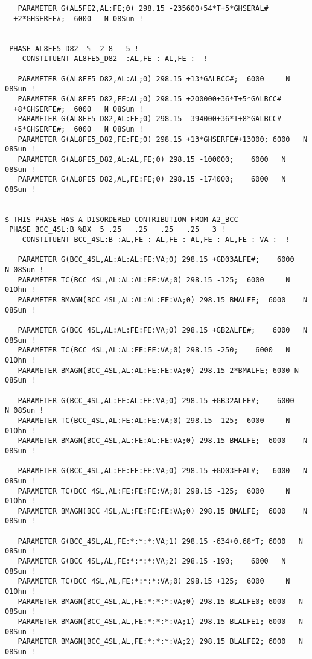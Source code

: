 \documentclass[12pt]{article}
\begin{document}
\begin{appendices}
{\begin{verbatim}
   PARAMETER G(AL5FE2,AL:FE;0) 298.15 -235600+54*T+5*GHSERAL#
  +2*GHSERFE#;  6000   N 08Sun !


 PHASE AL8FE5_D82  %  2 8   5 !
    CONSTITUENT AL8FE5_D82  :AL,FE : AL,FE :  !

   PARAMETER G(AL8FE5_D82,AL:AL;0) 298.15 +13*GALBCC#;  6000     N 08Sun !
   PARAMETER G(AL8FE5_D82,FE:AL;0) 298.15 +200000+36*T+5*GALBCC#
  +8*GHSERFE#;  6000   N 08Sun !
   PARAMETER G(AL8FE5_D82,AL:FE;0) 298.15 -394000+36*T+8*GALBCC#
  +5*GHSERFE#;  6000   N 08Sun !
   PARAMETER G(AL8FE5_D82,FE:FE;0) 298.15 +13*GHSERFE#+13000; 6000   N 08Sun !
   PARAMETER G(AL8FE5_D82,AL:AL,FE;0) 298.15 -100000;    6000   N 08Sun !
   PARAMETER G(AL8FE5_D82,AL,FE:FE;0) 298.15 -174000;    6000   N 08Sun !


$ THIS PHASE HAS A DISORDERED CONTRIBUTION FROM A2_BCC                  
 PHASE BCC_4SL:B %BX  5 .25   .25   .25   .25   3 !
    CONSTITUENT BCC_4SL:B :AL,FE : AL,FE : AL,FE : AL,FE : VA :  !

   PARAMETER G(BCC_4SL,AL:AL:AL:FE:VA;0) 298.15 +GD03ALFE#;    6000   N 08Sun !
   PARAMETER TC(BCC_4SL,AL:AL:AL:FE:VA;0) 298.15 -125;  6000     N 01Ohn !
   PARAMETER BMAGN(BCC_4SL,AL:AL:AL:FE:VA;0) 298.15 BMALFE;  6000    N 08Sun !
   
   PARAMETER G(BCC_4SL,AL:AL:FE:FE:VA;0) 298.15 +GB2ALFE#;    6000   N 08Sun !
   PARAMETER TC(BCC_4SL,AL:AL:FE:FE:VA;0) 298.15 -250;    6000   N 01Ohn !
   PARAMETER BMAGN(BCC_4SL,AL:AL:FE:FE:VA;0) 298.15 2*BMALFE; 6000 N 08Sun !
   
   PARAMETER G(BCC_4SL,AL:FE:AL:FE:VA;0) 298.15 +GB32ALFE#;    6000   N 08Sun !
   PARAMETER TC(BCC_4SL,AL:FE:AL:FE:VA;0) 298.15 -125;  6000     N 01Ohn !
   PARAMETER BMAGN(BCC_4SL,AL:FE:AL:FE:VA;0) 298.15 BMALFE;  6000    N 08Sun !
   
   PARAMETER G(BCC_4SL,AL:FE:FE:FE:VA;0) 298.15 +GD03FEAL#;   6000   N 08Sun !
   PARAMETER TC(BCC_4SL,AL:FE:FE:FE:VA;0) 298.15 -125;  6000     N 01Ohn !
   PARAMETER BMAGN(BCC_4SL,AL:FE:FE:FE:VA;0) 298.15 BMALFE;  6000    N 08Sun !
   
   PARAMETER G(BCC_4SL,AL,FE:*:*:*:VA;1) 298.15 -634+0.68*T; 6000   N 08Sun !
   PARAMETER G(BCC_4SL,AL,FE:*:*:*:VA;2) 298.15 -190;    6000   N 08Sun !
   PARAMETER TC(BCC_4SL,AL,FE:*:*:*:VA;0) 298.15 +125;  6000     N 01Ohn !
   PARAMETER BMAGN(BCC_4SL,AL,FE:*:*:*:VA;0) 298.15 BLALFE0; 6000   N 08Sun !
   PARAMETER BMAGN(BCC_4SL,AL,FE:*:*:*:VA;1) 298.15 BLALFE1; 6000   N 08Sun !
   PARAMETER BMAGN(BCC_4SL,AL,FE:*:*:*:VA;2) 298.15 BLALFE2; 6000   N 08Sun !




\end{verbatim}}
\end{appendices}
\end{document}
